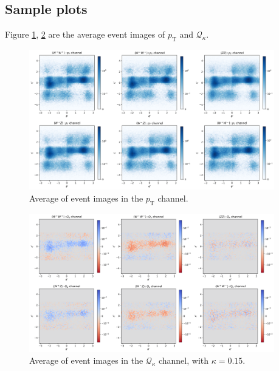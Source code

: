 \documentclass[12pt]{article}
\begin{document}
	\subsection{Sample plots}%
	\label{sub:sample_plots}
		 Figure \ref{fig:event_image_PT_deltaeta}, \ref{fig:event_image_Qk_deltaeta} are the average event images of $p_\text{T}$ and $\mathcal{Q}_\kappa$.
		\begin{figure}[htpb]
			\centering
			\includegraphics[width=0.95\textwidth]{event_image_PT-deltaeta.png}
			\caption{Average of event images in the $p_\text{T}$ channel.}
			\label{fig:event_image_PT_deltaeta}
		\end{figure}
		\begin{figure}[htpb]
			\centering
			\includegraphics[width=0.95\textwidth]{event_image_Qk-deltaeta.png}
			\caption{Average of event images in the $\mathcal{Q}_\kappa$ channel, with $\kappa = 0.15$.}
			\label{fig:event_image_Qk_deltaeta}
		\end{figure}
\end{document}

